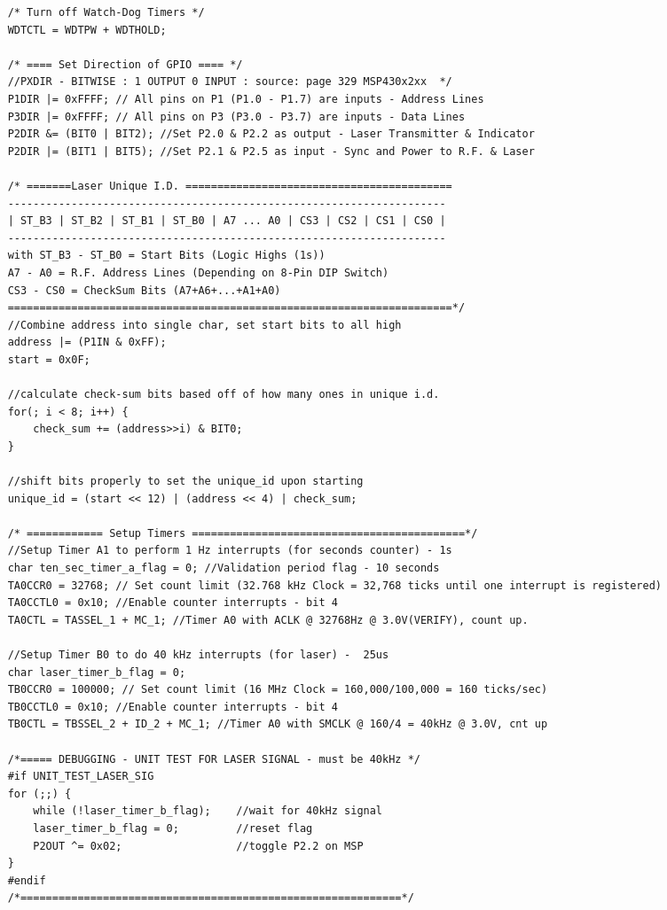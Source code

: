 \documentclass[letterpaper,10pt]{article}
\begin{document}
\begin{spacing}{1.15}
\begin{lstlisting}
	/* Turn off Watch-Dog Timers */
	WDTCTL = WDTPW + WDTHOLD; 
	
	/* ==== Set Direction of GPIO ==== */
	//PXDIR - BITWISE : 1 OUTPUT 0 INPUT : source: page 329 MSP430x2xx  */
	P1DIR |= 0xFFFF; // All pins on P1 (P1.0 - P1.7) are inputs - Address Lines
	P3DIR |= 0xFFFF; // All pins on P3 (P3.0 - P3.7) are inputs - Data Lines
	P2DIR &= (BIT0 | BIT2); //Set P2.0 & P2.2 as output - Laser Transmitter & Indicator
	P2DIR |= (BIT1 | BIT5); //Set P2.1 & P2.5 as input - Sync and Power to R.F. & Laser
	
	/* =======Laser Unique I.D. ==========================================
	---------------------------------------------------------------------
	| ST_B3 | ST_B2 | ST_B1 | ST_B0 | A7 ... A0 | CS3 | CS2 | CS1 | CS0 |
	---------------------------------------------------------------------
	with ST_B3 - ST_B0 = Start Bits (Logic Highs (1s))
	A7 - A0 = R.F. Address Lines (Depending on 8-Pin DIP Switch)
	CS3 - CS0 = CheckSum Bits (A7+A6+...+A1+A0)
	======================================================================*/
	//Combine address into single char, set start bits to all high
	address |= (P1IN & 0xFF);
	start = 0x0F;
	
	//calculate check-sum bits based off of how many ones in unique i.d.
	for(; i < 8; i++) {
		check_sum += (address>>i) & BIT0;
	}
	
	//shift bits properly to set the unique_id upon starting
	unique_id = (start << 12) | (address << 4) | check_sum;
	
	/* ============ Setup Timers ===========================================*/
	//Setup Timer A1 to perform 1 Hz interrupts (for seconds counter) - 1s
	char ten_sec_timer_a_flag = 0; //Validation period flag - 10 seconds
	TA0CCR0 = 32768; // Set count limit (32.768 kHz Clock = 32,768 ticks until one interrupt is registered)
	TA0CCTL0 = 0x10; //Enable counter interrupts - bit 4
	TA0CTL = TASSEL_1 + MC_1; //Timer A0 with ACLK @ 32768Hz @ 3.0V(VERIFY), count up.
	
	//Setup Timer B0 to do 40 kHz interrupts (for laser) -  25us
	char laser_timer_b_flag = 0;
	TB0CCR0 = 100000; // Set count limit (16 MHz Clock = 160,000/100,000 = 160 ticks/sec)
	TB0CCTL0 = 0x10; //Enable counter interrupts - bit 4
	TB0CTL = TBSSEL_2 + ID_2 + MC_1; //Timer A0 with SMCLK @ 160/4 = 40kHz @ 3.0V, cnt up
	
	/*===== DEBUGGING - UNIT TEST FOR LASER SIGNAL - must be 40kHz */
	#if UNIT_TEST_LASER_SIG
	for (;;) {
		while (!laser_timer_b_flag);    //wait for 40kHz signal
		laser_timer_b_flag = 0;         //reset flag
		P2OUT ^= 0x02;                  //toggle P2.2 on MSP
	}
	#endif
	/*============================================================*/
	

\end{lstlisting}
\end{spacing}
\end{document}
